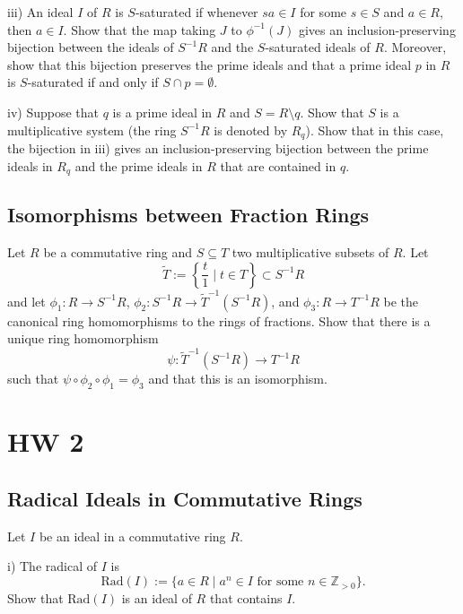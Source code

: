 \documentclass[lang=cn,11pt]{template}
\begin{document}
iii) An ideal \( I \) of \( R \) is \( S \)-saturated if whenever \( sa \in I \) for some \( s \in S \) and \( a \in R \), then \( a \in I \). Show that the map taking \( J \) to \( \phi^{-1}(J) \) gives an inclusion-preserving bijection between the ideals of \( S^{-1}R \) and the \( S \)-saturated ideals of \( R \). Moreover, show that this bijection preserves the prime ideals and that a prime ideal \( p \) in \( R \) is \( S \)-saturated if and only if \( S \cap p = \emptyset \).

iv) Suppose that \( q \) is a prime ideal in \( R \) and \( S = R \setminus q \). Show that \( S \) is a multiplicative system (the ring \( S^{-1}R \) is denoted by \( R_q \)). Show that in this case, the bijection in iii) gives an inclusion-preserving bijection between the prime ideals in \( R_q \) and the prime ideals in \( R \) that are contained in \( q \).

\section{Isomorphisms between Fraction Rings}
Let \( R \) be a commutative ring and \( S \subseteq T \) two multiplicative subsets of \( R \). Let
\[
\tilde{T} := \left\{ \frac{t}{1} \mid t \in T \right\} \subset S^{-1}R
\]
and let \( \phi_1 : R \rightarrow S^{-1}R \), \( \phi_2 : S^{-1}R \rightarrow \tilde{T}^{-1}(S^{-1}R) \), and \( \phi_3 : R \rightarrow T^{-1}R \) be the canonical ring homomorphisms to the rings of fractions. Show that there is a unique ring homomorphism
\[
\psi : \tilde{T}^{-1}(S^{-1}R) \rightarrow T^{-1}R
\]
such that \( \psi \circ \phi_2 \circ \phi_1 = \phi_3 \) and that this is an isomorphism.








\chapter{HW 2}

\section{Radical Ideals in Commutative Rings}
Let \( I \) be an ideal in a commutative ring \( R \).

i) The radical of \( I \) is
\[
\text{Rad}(I) := \{ a \in R \mid a^n \in I \text{ for some } n \in \mathbb{Z}_{>0} \}.
\]
Show that \( \text{Rad}(I) \) is an ideal of \( R \) that contains \( I \).
\end{document}

